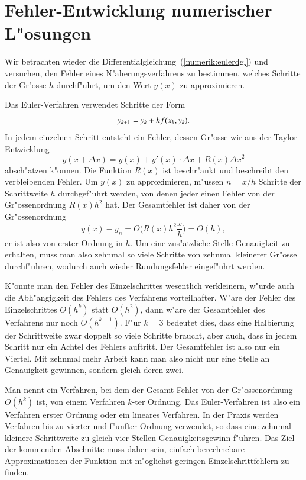 \section{Fehler-Entwicklung numerischer L"osungen}
Wir betrachten wieder die Differentialgleichung~(\ref{numerik:eulerdgl})
und versuchen, den Fehler eines N"aherungsverfahrens zu bestimmen,
welches Schritte der Gr"osse $h$ durchf"uhrt, um den Wert $y(x)$
zu approximieren.

Das Euler-Verfahren verwendet Schritte der Form
\[
y_{k+1}=y_{k\mathstrut} + hf(x_{k\mathstrut},y_{k\mathstrut}).
\]
In jedem einzelnen Schritt entsteht ein Fehler, dessen Gr"osse wir
aus der Taylor-Entwicklung
\[
y(x+\Delta x)=
y(x) + y'(x)\cdot \Delta x + R(x) \Delta x^2
\]
absch"atzen k"onnen.
Die Funktion $R(x)$ ist beschr"ankt und beschreibt den verbleibenden
Fehler.
Um $y(x)$ zu approximieren, m"ussen $n=x/h$ Schritte der Schrittweite
$h$ durchgef"uhrt werden, von denen jeder einen Fehler
von der Gr"ossenordnung $R(x)h^2$ hat.
Der Gesamtfehler ist daher von der Gr"ossenordnung
\[
y(x)-y_n=O\biggl(R(x)h^2\frac{x}h\biggr)=O(h),
\]
er ist also von erster Ordnung in $h$.
Um eine zus"atzliche Stelle Genauigkeit zu erhalten, muss man also zehnmal
so viele Schritte von zehnmal kleinerer Gr"osse durchf"uhren,
wodurch auch wieder Rundungsfehler eingef"uhrt werden.

K"onnte man den Fehler des Einzelschrittes wesentlich verkleinern, w"urde
auch die Abh"angigkeit des Fehlers des Verfahrens vorteilhafter.
W"are der Fehler des Einzelschrittes $O(h^k)$ statt $O(h^2)$, dann
w"are der Gesamtfehler des Verfahrens nur noch $O(h^{k-1})$.
F"ur $k=3$ bedeutet dies, dass eine Halbierung der Schrittweite
zwar doppelt so viele Schritte braucht, aber auch, dass in jedem
Schritt nur ein Achtel des Fehlers auftritt.
Der Gesamtfehler ist also nur ein Viertel.
Mit zehnmal mehr Arbeit kann man also nicht nur eine Stelle an
Genauigkeit gewinnen, sondern gleich deren zwei.

Man nennt ein Verfahren, bei dem der Gesamt-Fehler von der Gr"ossenordnung
$O(h^k)$ ist, von einem Verfahren $k$-ter Ordnung.
Das Euler-Verfahren ist also ein Verfahren erster Ordnung oder ein
lineares Verfahren.
In der Praxis werden Verfahren bis zu vierter und f"unfter Ordnung
verwendet, so dass eine zehnmal kleinere Schrittweite zu gleich
vier Stellen Genauigkeitsgewinn f"uhren.
Das Ziel der kommenden Abschnitte muss daher sein, einfach
berechnebare Approximationen der Funktion mit m"oglichst geringen
Einzelschrittfehlern zu finden.

